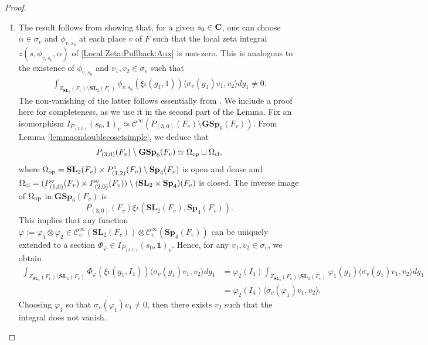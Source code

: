 \documentclass[11pt, reqno]{amsart}
\theoremstyle{plain}
\theoremstyle{definition}
\theoremstyle{remark}
\theoremstyle{plain}
\def\C{{\bf C}}
\def\SL{{\mathbf{SL}}}
\def\GSp{{\mathbf{GSp}}}
\def\Sp{{\mathbf{Sp}}}
\begin{document}
\begin{proof} \leavevmode
   \begin{enumerate} 
    \item The result follows from showing that, for a given  $s_0\in\C$, one can choose  $\alpha \in \sigma_v$ and $\phi_{v,s_0}$  at each place $v$ of $F$ such that the  local zeta integral $z(s, \phi_{v,s_0}, \alpha)$ of \eqref{Local:Zeta:Pullback:Aux} is non-zero. This is analogous to the existence of $\phi_{v,s_0}$ and $v_1,v_2\in\sigma_v$ such that 
    \begin{align}\label{lemma710_int_step}
        \int_{Z_{\SL_2}(F_v)\setminus \SL_2(F_v)}\phi_{v,s_0}(\xi\iota( g_1,1))\langle \sigma_v(g_1)v_1,v_2\rangle dg_1\neq 0.
    \end{align}
    The non-vanishing of the latter follows essentially from \cite[Theorem 3.2.2 (ii)]{Kudla:Rallis:lost}. We include a proof here for completeness, as we use it in the second part of the Lemma.
    Fix an isomorphism $I_{P_{(3,0)}}(s_0,\mathbf{1})_v\simeq \mathcal{C}^{\infty}(P_{(3,0)}(F_v)\setminus \GSp_6(F_v))$. From Lemma \ref{lemmaondoublecosetsimple}, we deduce that 
    \begin{equation*}P_{(3,0)}(F_v)\setminus \GSp_6(F_v)\simeq \Omega_{\rm op} \sqcup \Omega_{\rm cl},
    \end{equation*}
    where $\Omega_{\rm op} = \SL_2(F_v)\times P^{\circ}_{(1,2)}(F_v)\setminus \Sp_4(F_v)$ is open and dense and $\Omega_{\rm cl} = (P^{\circ}_{(1,0)}(F_v)\times P^{\circ}_{(2,0)}(F_v))\setminus(\SL_2\times \Sp_4)(F_v)$ is closed. The inverse image of $\Omega_{\rm op}$ in $\GSp_6(F_v)$ is $$P_{(3,0)}(F_v)\xi\iota(\SL_2(F_v),\Sp_4(F_v)).$$ This implies that any function $\varphi := \varphi_1\otimes\varphi_2\in \mathcal{C}^{\infty}_c(\SL_2(F_v))\otimes\mathcal{C}^{\infty}_c( \Sp_4(F_v))$ can be uniquely extended to a section $\Phi_{\varphi}\in I_{P_{(3,0)}}(s_0,\mathbf{1})_v$. Hence,  for any $v_1,v_2\in \sigma_v$, we obtain 
    \begin{align*}\int_{Z_{\SL_2}(F_v)\setminus \SL_2(F_v)}\!\!\!\!\!\!\Phi_{\varphi}(\xi\iota( g_1,I_4))\langle \sigma_v(g_1)v_1,v_2\rangle dg_1 &= \varphi_2(I_4)\int_{Z_{\SL_2}(F_v)\setminus \SL_2(F_v)}\!\!\!\!\!\varphi_1(g_1)\langle \sigma_v(g_1)v_1,v_2\rangle dg_1\\ &= \varphi_2(I_4)\langle\sigma_v(\varphi_1)v_1,v_2\rangle.\end{align*}
    Choosing $\varphi_1$ so that $\sigma_v(\varphi_1)v_1\neq 0$, then there exists $v_2$ such that the integral does not vanish.
    

\end{enumerate}
\end{proof}
\end{document}
